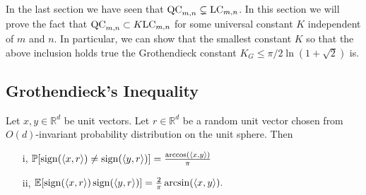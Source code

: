 In the last section we have seen that $\textup{QC}_{m,n}\subsetneq \textup{LC}_{m,n}$. In this section we will prove the fact that $\textup{QC}_{m,n}\subset K\textup{LC}_{m,n}$ for some universal constant $K$ independent of $m$ and $n$. In particular, we can show that the smallest constant $K$ so that the above inclusion holds true the Grothendieck constant $K_G\leq \pi/2\ln(1+\sqrt{2})$ is. 

\subsection{Grothendieck's Inequality}
	\begin{lemma}\label{lem:G_id}
		Let $x,y\in\mathbb{R}^d$ be unit vectors. Let $r\in\mathbb{R}^d$ be a random unit vector chosen from $O(d)$-invariant probability distribution on the unit sphere. Then
		\begin{enumerate}
			\item[i,] $\mathbb{P}[\operatorname{sign}(\langle{x},{r}\rangle)\neq\operatorname{sign}(\langle{y},{r}\rangle)]=\frac{\arccos(\langle{x},{y}\rangle)}{\pi}$
			\item[ii,] $\mathbb{E}[\operatorname{sign}(\langle{x},{r}\rangle)\operatorname{sign}(\langle{y},{r}\rangle)]=\frac{2}{\pi}\arcsin(\langle{x},{y}\rangle).$
		\end{enumerate}
	\end{lemma}
